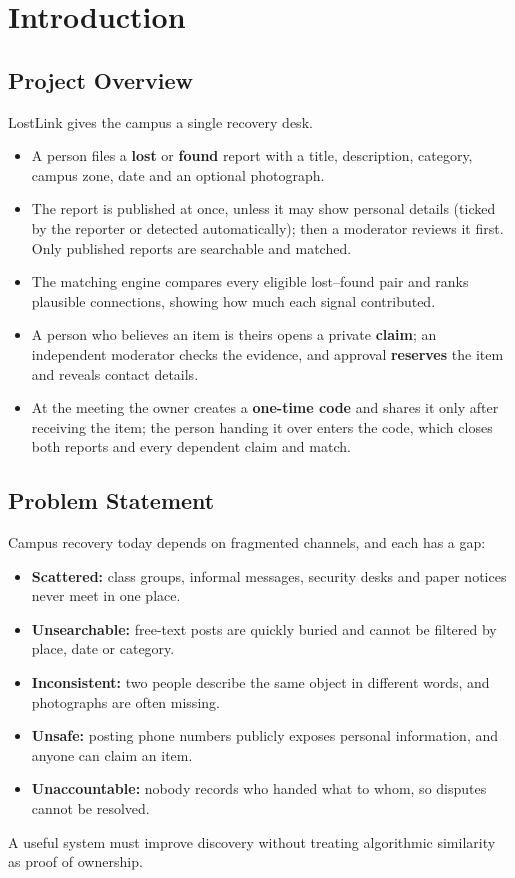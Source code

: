 \documentclass[12pt,a4paper,oneside]{report}
\begin{document}
\clearpage
{}
\setcounter{page}{1}

\chapter{Introduction}

\section{Project Overview}
LostLink gives the campus a single recovery desk.
\begin{itemize}
  \item A person files a \textbf{lost} or \textbf{found} report with a title, description, category, campus zone, date and an optional photograph.
  \item The report is published at once, unless it may show personal details (ticked by the reporter or detected automatically); then a moderator reviews it first. Only published reports are searchable and matched.
  \item The matching engine compares every eligible lost--found pair and ranks plausible connections, showing how much each signal contributed.
  \item A person who believes an item is theirs opens a private \textbf{claim}; an independent moderator checks the evidence, and approval \textbf{reserves} the item and reveals contact details.
  \item At the meeting the owner creates a \textbf{one-time code} and shares it only after receiving the item; the person handing it over enters the code, which closes both reports and every dependent claim and match.
\end{itemize}

\section{Problem Statement}
Campus recovery today depends on fragmented channels, and each has a gap:
\begin{itemize}
  \item \textbf{Scattered:} class groups, informal messages, security desks and paper notices never meet in one place.
  \item \textbf{Unsearchable:} free-text posts are quickly buried and cannot be filtered by place, date or category.
  \item \textbf{Inconsistent:} two people describe the same object in different words, and photographs are often missing.
  \item \textbf{Unsafe:} posting phone numbers publicly exposes personal information, and anyone can claim an item.
  \item \textbf{Unaccountable:} nobody records who handed what to whom, so disputes cannot be resolved.
\end{itemize}
A useful system must improve discovery without treating algorithmic similarity as proof of ownership.
\end{document}
